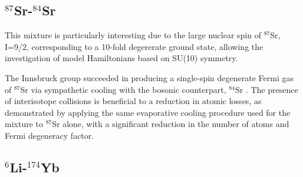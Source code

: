 \documentclass[pra,letterpaper,twocolumn,showpacs,superscriptaddress]{revtex4}
\begin{document}
\subsection{${}^{87}$Sr-${}^{84}$Sr}

This mixture is particularly interesting due to the large nuclear spin of ${}^{87}$Sr, I=9/2, corresponding to a 10-fold degererate ground state, 
allowing the investigation of model Hamiltonians based on SU(10) symmetry. 

The Innsbruck group succeeded in producing a single-spin degenerate Fermi gas of ${}^{87}$Sr via sympathetic cooling with the bosonic counterpart, 
${}^{84}$Sr \cite{Tey2010}. The presence of interisotope collisions is beneficial to a reduction in atomic losses, as demonstrated by applying the same 
evaporative cooling procedure used for the mixture to ${}^{87}$Sr alone, with a significant reduction in the number of atoms and Fermi degeneracy factor.

\subsection{${}^{6}$Li-${}^{174}$Yb}
\end{document}
